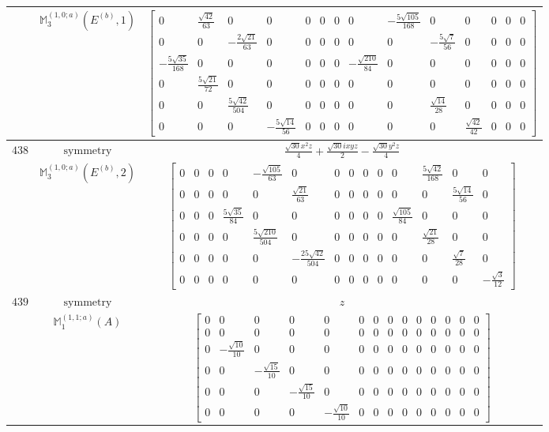 \documentclass[fleqn,8pt,landscape]{jsarticle}
\begin{document}
\begin{longtable}{ccc}
$  $ & $ \mathbb{M}_{3}^{(1,0;a)}(E^{(b)},1) $ & $ \begin{bmatrix} 0 & \frac{\sqrt{42}}{63} & 0 & 0 & 0 & 0 & 0 & 0 & - \frac{5 \sqrt{105}}{168} & 0 & 0 & 0 & 0 & 0 \\ 0 & 0 & - \frac{2 \sqrt{21}}{63} & 0 & 0 & 0 & 0 & 0 & 0 & - \frac{5 \sqrt{7}}{56} & 0 & 0 & 0 & 0 \\ - \frac{5 \sqrt{35}}{168} & 0 & 0 & 0 & 0 & 0 & 0 & - \frac{\sqrt{210}}{84} & 0 & 0 & 0 & 0 & 0 & 0 \\ 0 & \frac{5 \sqrt{21}}{72} & 0 & 0 & 0 & 0 & 0 & 0 & 0 & 0 & 0 & 0 & 0 & 0 \\ 0 & 0 & \frac{5 \sqrt{42}}{504} & 0 & 0 & 0 & 0 & 0 & 0 & \frac{\sqrt{14}}{28} & 0 & 0 & 0 & 0 \\ 0 & 0 & 0 & - \frac{5 \sqrt{14}}{56} & 0 & 0 & 0 & 0 & 0 & 0 & \frac{\sqrt{42}}{42} & 0 & 0 & 0 \end{bmatrix} $ \\ \hline
$ 438 $ & $ \text{symmetry} $ & $ \frac{\sqrt{30} x^{2} z}{4} + \frac{\sqrt{30} i x y z}{2} - \frac{\sqrt{30} y^{2} z}{4} $ \\
$  $ & $ \mathbb{M}_{3}^{(1,0;a)}(E^{(b)},2) $ & $ \begin{bmatrix} 0 & 0 & 0 & 0 & - \frac{\sqrt{105}}{63} & 0 & 0 & 0 & 0 & 0 & 0 & \frac{5 \sqrt{42}}{168} & 0 & 0 \\ 0 & 0 & 0 & 0 & 0 & \frac{\sqrt{21}}{63} & 0 & 0 & 0 & 0 & 0 & 0 & \frac{5 \sqrt{14}}{56} & 0 \\ 0 & 0 & 0 & \frac{5 \sqrt{35}}{84} & 0 & 0 & 0 & 0 & 0 & 0 & \frac{\sqrt{105}}{84} & 0 & 0 & 0 \\ 0 & 0 & 0 & 0 & \frac{5 \sqrt{210}}{504} & 0 & 0 & 0 & 0 & 0 & 0 & \frac{\sqrt{21}}{28} & 0 & 0 \\ 0 & 0 & 0 & 0 & 0 & - \frac{25 \sqrt{42}}{504} & 0 & 0 & 0 & 0 & 0 & 0 & \frac{\sqrt{7}}{28} & 0 \\ 0 & 0 & 0 & 0 & 0 & 0 & 0 & 0 & 0 & 0 & 0 & 0 & 0 & - \frac{\sqrt{3}}{12} \end{bmatrix} $ \\ \hline
$ 439 $ & $ \text{symmetry} $ & $ z $ \\
$  $ & $ \mathbb{M}_{1}^{(1,1;a)}(A) $ & $ \begin{bmatrix} 0 & 0 & 0 & 0 & 0 & 0 & 0 & 0 & 0 & 0 & 0 & 0 & 0 & 0 \\ 0 & 0 & 0 & 0 & 0 & 0 & 0 & 0 & 0 & 0 & 0 & 0 & 0 & 0 \\ 0 & - \frac{\sqrt{10}}{10} & 0 & 0 & 0 & 0 & 0 & 0 & 0 & 0 & 0 & 0 & 0 & 0 \\ 0 & 0 & - \frac{\sqrt{15}}{10} & 0 & 0 & 0 & 0 & 0 & 0 & 0 & 0 & 0 & 0 & 0 \\ 0 & 0 & 0 & - \frac{\sqrt{15}}{10} & 0 & 0 & 0 & 0 & 0 & 0 & 0 & 0 & 0 & 0 \\ 0 & 0 & 0 & 0 & - \frac{\sqrt{10}}{10} & 0 & 0 & 0 & 0 & 0 & 0 & 0 & 0 & 0 \end{bmatrix} $ \\ \hline

\end{longtable}
\end{document}
